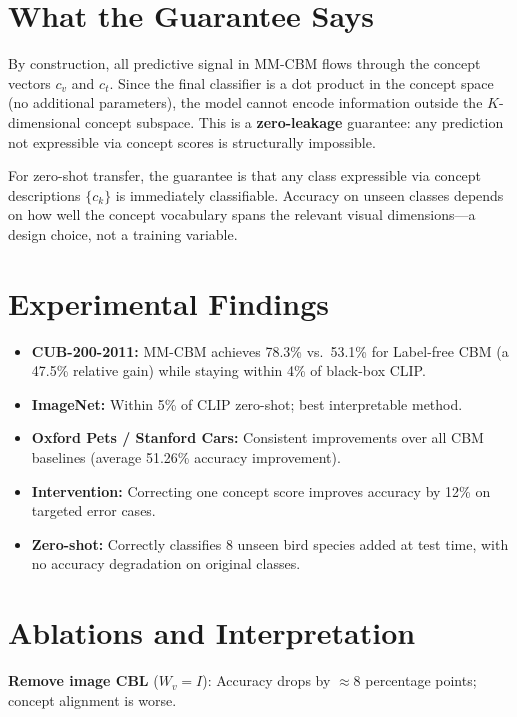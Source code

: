 \documentclass[10pt,twocolumn]{article}
\begin{document}
\section{What the Guarantee Says}

By construction, all predictive signal in MM-CBM flows through the
concept vectors $c_v$ and $c_t$. Since the final classifier is a dot
product in the concept space (no additional parameters), the model cannot
encode information outside the $K$-dimensional concept subspace. This is
a \textbf{zero-leakage} guarantee: any prediction not expressible via
concept scores is structurally impossible.

For zero-shot transfer, the guarantee is that any class expressible via
concept descriptions $\{c_k\}$ is immediately classifiable. Accuracy
on unseen classes depends on how well the concept vocabulary spans the
relevant visual dimensions---a design choice, not a training variable.

\section{Experimental Findings}

\begin{itemize}[itemsep=2pt,parsep=0pt]
  \item \textbf{CUB-200-2011:} MM-CBM achieves 78.3\% vs.\ 53.1\%
    for Label-free CBM (a 47.5\% relative gain) while staying within
    4\% of black-box CLIP.
  \item \textbf{ImageNet:} Within 5\% of CLIP zero-shot; best
    interpretable method.
  \item \textbf{Oxford Pets / Stanford Cars:} Consistent improvements
    over all CBM baselines (average 51.26\% accuracy improvement).
  \item \textbf{Intervention:} Correcting one concept score improves
    accuracy by 12\% on targeted error cases.
  \item \textbf{Zero-shot:} Correctly classifies 8 unseen bird species
    added at test time, with no accuracy degradation on original classes.
\end{itemize}

\section{Ablations and Interpretation}

\textbf{Remove image CBL} ($W_v = I$): Accuracy drops by $\approx8$
percentage points; concept alignment is worse.
\end{document}

